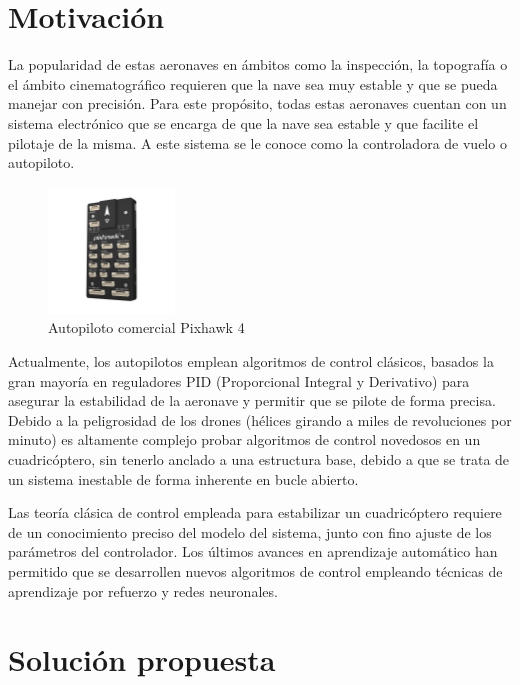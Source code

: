 \section{Motivación}

La popularidad de estas aeronaves en ámbitos como la inspección, la topografía o el ámbito cinematográfico requieren que la nave sea muy estable y que se pueda manejar con precisión. Para este propósito, todas estas aeronaves cuentan con un sistema electrónico que se encarga de que la nave sea estable y que facilite el pilotaje de la misma. A este sistema se le conoce como la controladora de vuelo o autopiloto.

\begin{figure}[htb!]
	\centering
	\includegraphics[width=0.3\textwidth]{introduccion/pixhawk4.jpg}
	\caption{Autopiloto comercial Pixhawk 4}
	\label{pixhawk}
\end{figure}

Actualmente, los autopilotos emplean algoritmos de control clásicos, basados la gran mayoría en reguladores PID (Proporcional Integral y Derivativo) para asegurar la estabilidad de la aeronave y permitir que se pilote de forma precisa. Debido a la peligrosidad de los drones (hélices girando a miles de revoluciones por minuto) es altamente complejo probar algoritmos de control novedosos en un cuadricóptero, sin tenerlo anclado a una estructura base, debido a que se trata de un sistema inestable de forma inherente en bucle abierto.

Las teoría clásica de control empleada para estabilizar un cuadricóptero requiere de un conocimiento preciso del modelo del sistema, junto con fino ajuste de los parámetros del controlador. Los últimos avances en aprendizaje automático han permitido que se desarrollen nuevos algoritmos de control empleando técnicas de aprendizaje por refuerzo y redes neuronales.



\section{Solución propuesta}

